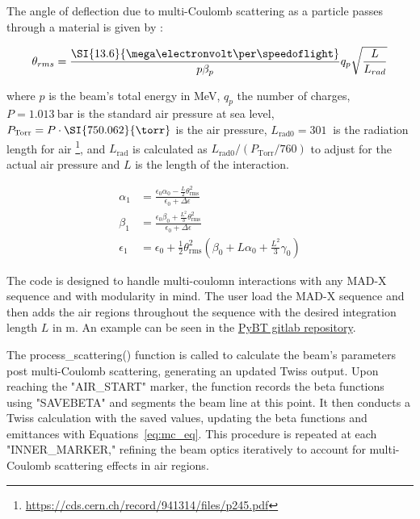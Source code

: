 \documentclass[a4paper,
               biblatex,     %
               ]{jacow}
\begin{document}
The angle of deflection due to multi-Coulomb scattering as a particle passes through a material is given by  \cite{muller_description_2001}:

\[
\theta_{rms} = \frac{\SI{13.6}{\mega\electronvolt\per\speedoflight}}{p\beta_{p}}q_{p}\sqrt\frac{L}{L_{rad}}\]

where $p$ is the beam's total energy in MeV, $q_{p}$ the number of charges, $P=\SI{1.013}{\bar}$ is the standard air pressure at sea level, $P_{\text{Torr}}=P\cdot\SI{750.062}{\torr}$ is the air pressure, $L_{\text{rad0}}=\SI{301}{}$ is the radiation length for air \footnote{\href{https://cds.cern.ch/record/941314/files/p245.pdf}{{https://cds.cern.ch/record/941314/files/p245.pdf}}}, and $L_{\text{rad}}$ is calculated as $L_{\text{rad0}}/(P_{\text{Torr}}/760)$ to adjust for the actual air pressure and $L$ is the length of the interaction.


\begin{equation}
\label{eq:mc_eq}
\begin{aligned}
\alpha_{1} &= \frac{\epsilon_0 \alpha_0 - \frac{L}{2} \theta_{\text{rms}}^2}{\epsilon_0 + \Delta \epsilon}\\
\beta_{1} &= \frac{\epsilon_0 \beta_0 + \frac{L^2}{3} \theta_{\text{rms}}^2}{\epsilon_0 + \Delta \epsilon}\\
\epsilon_{1} &= \epsilon_0 + \frac{1}{2} \theta_{\text{rms}}^2 \left( \beta_0 + L \alpha_0 + \frac{L^2}{3} \gamma_0 \right)
\end{aligned}
\end{equation}

The code is designed to handle multi-coulomn interactions with any MAD-X sequence and with modularity in mind. The user load the MAD-X sequence and then adds the air regions throughout the sequence with the desired integration length $L$ in m. An example can be seen in the \href{https://gitlab.cern.ch/abt-optics-and-code-repository/simulation-codes/pybt/-/blob/master/pybt/examples/example_air_scattering.ipynb}{PyBT gitlab repository}.

The process\_scattering() function is called to calculate the beam's parameters post multi-Coulomb scattering, generating an updated Twiss output. Upon reaching the "AIR\_START" marker, the function records the beta functions using "SAVEBETA" and segments the beam line at this point. It then conducts a Twiss calculation with the saved values, updating the beta functions and emittances with Equations~\ref{eq:mc_eq}. This procedure is repeated at each "INNER\_MARKER," refining the beam optics iteratively to account for multi-Coulomb scattering effects in air regions.
\end{document}
